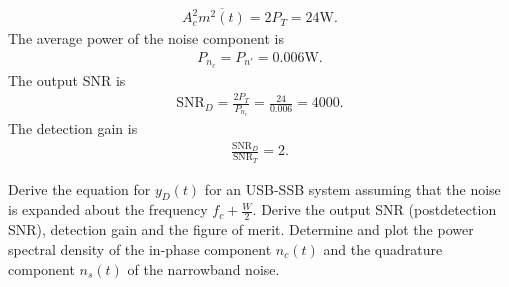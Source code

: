 \documentclass{assignment}
\begin{document}
\begin{sol}
\begin{align}
        A_c^2\overline{m^2(t)}=2P_T=24\mathrm{W}.
    \end{align}
    The average power of the noise component is
    \begin{align}
        P_{n_c}=P_{n'}=0.006\mathrm{W}.
    \end{align}
    The output SNR is
    \begin{align}
        \text{SNR}_D=\frac{2P_T}{P_{n_c}}=\frac{24}{0.006}=4000.
    \end{align}
    The detection gain is
    \begin{align}
        \frac{\text{SNR}_D}{\text{SNR}_T}=2.
    \end{align}
\end{sol}

\begin{prob}
    Derive the equation for $y_D(t)$ for an USB-SSB system assuming that the noise is expanded about the frequency $f_c+\frac{W}{2}$. Derive the output SNR (postdetection SNR), detection gain and the figure of merit. Determine and plot the power spectral density of the in-phase component $n_c(t)$ and the quadrature component $n_s(t)$ of the narrowband noise.
\end{prob}
\end{document}
